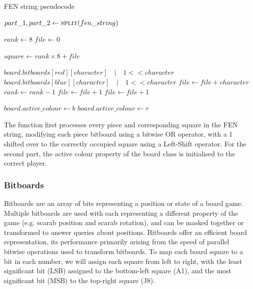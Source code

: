 \documentclass[../main/main.tex]{subfiles}
\begin{document}
\begin{algorithm}[H]
\caption{FEN string pseudocode}
\label{alg:fen-string}
\begin{algorithmic}
        \State $part\_1, part\_2 \gets \Call{split}{fen\_string}$

        \State$rank \gets 8$
        \State$file \gets 0$

        \bigskip

            \State$square \gets rank \times 8 + file$

                    \State $board.bitboards[red][character] \quad | \quad 1 << character$
                \Else
                    \State $board.bitboards[blue][character] \quad | \quad 1 << character$
                \EndIf
                \State $file \gets file + character$
                \State $rank \gets rank - 1$
                \State $file \gets file + 1$
            \Else
                \State $file \gets file + 1$
            \EndIf

        \bigskip

            \State $board.active\_colour \gets b$
        \Else
            \State $board.active\_colour \gets r$
        \EndIf
        \EndFor
    \EndFunction
\end{algorithmic}
\end{algorithm}

The function first processes every piece and corresponding square in the FEN string, modifying each piece bitboard using a bitwise OR operator, with a 1 shifted over to the correctly occupied square using a Left-Shift operator. For the second part, the active colour property of the board class is initialised to the correct player.

\subsubsection*{Bitboards}
\label{sec:design-bitboards}
Bitboards are an array of bits representing a position or state of a board game. Multiple bitboards are used with each representing a different property of the game (e.g. scarab position and scarab rotation), and can be masked together or transformed to answer queries about positions. Bitboards offer an efficient board representation, its performance primarily arising from the speed of parallel bitwise operations used to transform bitboards.
To map each board square to a bit in each number, we will assign each square from left to right, with the least significant bit (LSB) assigned to the bottom-left square (A1), and the most significant bit (MSB) to the top-right square (J8).
\end{document}
